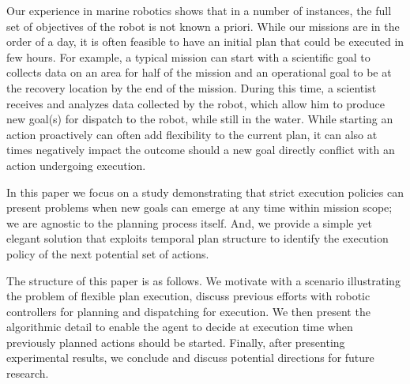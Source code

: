 Our experience in marine robotics shows that in a number of instances,
the full set of objectives of the robot is not known a priori. While
our missions are in the order of a day, it is often feasible to have
an initial plan that could be executed in few hours. For example, a
typical mission can start with a scientific goal to collects data on
an area for half of the mission and an operational goal to be at the
recovery location by the end of the mission. During this time, a
scientist receives and analyzes data collected by the robot, which
allow him to produce new goal(s) for dispatch to the robot, while
still in the water.  While starting an action proactively can often
add flexibility to the current plan, it can also at times negatively
impact the outcome should a new goal directly conflict with an action
undergoing execution.

In this paper we focus on a study demonstrating that strict execution
policies can present problems when new goals can emerge at any time
within mission scope; we are agnostic to the planning process
itself. And, we provide a simple yet elegant solution that exploits
temporal plan structure to identify the execution policy of the next
potential set of actions. %



The structure of this paper is as follows. We motivate with a
scenario illustrating the problem of flexible plan execution, discuss
previous efforts with robotic controllers for planning and dispatching
for execution. We then present the algorithmic detail to enable the
agent to decide at execution time when previously planned actions 
should be started. Finally, after presenting experimental results, 
we conclude and discuss potential directions for future research.

